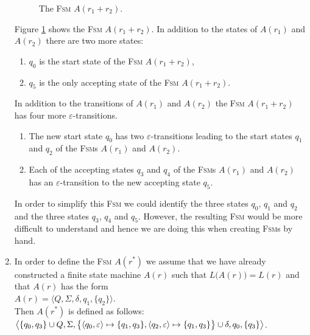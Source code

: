 \begin{enumerate}
      \begin{figure}[!ht]
        \centering
      \caption{The \textsc{Fsm} $A(r_1 + r_2)$.}
      \label{fig:aPlus.eps}
      \end{figure}
      Figure \ref{fig:aPlus.eps} shows the \textsc{Fsm} $A(r_1 + r_2)$.
      In addition to the states of $A(r_1)$ and $A(r_2)$ there are two more states:
      \begin{enumerate}
      \item $q_0$ is the start state of the \textsc{Fsm} $A(r_1 + r_2)$,
      \item $q_5$ is the only accepting state of the \textsc{Fsm} $A(r_1 + r_2)$.
      \end{enumerate}
      In addition to the transitions of $A(r_1)$ and $A(r_2)$ the \textsc{Fsm} $A(r_1+r_2)$
      has four more $\varepsilon$-transitions.
      \begin{enumerate}
      \item The new start state $q_0$ has two
            $\varepsilon$-transitions leading to the start states $q_1$ and $q_2$ of the \textsc{Fsm}s
            $A(r_1)$ and $A(r_2)$.
      \item Each of the accepting states $q_3$ and $q_4$ of the \textsc{Fsm}s
             $A(r_1)$ and $A(r_2)$ has an $\varepsilon$-transition to the new accepting state $q_5$.
      \end{enumerate}
      In order to simplify this \textsc{Fsm} we could identify the three states
      $q_0$, $q_1$ and $q_2$ and the three states $q_3$, $q_4$ and $q_5$.  However, the resulting \textsc{Fsm}
      would be more difficult to understand and hence we are \underline{} doing this when creating 
      \textsc{Fsm}s by hand.
\item In order to define the \textsc{Fsm} $A(r^*)$ we assume that we have already constructed a finite
      state machine $A(r)$ such that $L\bigl(A(r)\bigr) = L(r)$ and that $A(r)$ has the form
      \\[0.2cm]
      \hspace*{1.3cm}
      $A(r) = \bigl\langle Q, \Sigma, \delta, q_1, \{ q_2 \} \bigr\rangle$.
      \\[0.2cm]
      Then  $A(r^*)$ is defined as follows:
      \\[0.2cm]
      \hspace*{0.8cm}
       $\bigl\langle \{ q_0, q_3 \} \cup Q, \Sigma, 
                \bigl\{ \pair(q_0,\varepsilon) \mapsto \{q_1, q_3\}, \pair(q_2,\varepsilon) \mapsto \{q_1, q_3\} \bigr\} 
                \cup \delta, q_0, \{ q_3 \} \bigr\rangle$.
      \\[0.2cm]



\end{enumerate}
